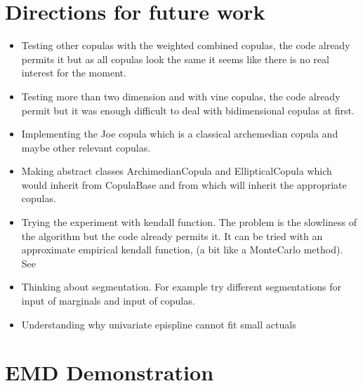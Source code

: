 \documentclass{article}
\begin{document}
	
	\newpage
	\section{Directions for future work}
	\label{sec:directions}
	\begin{itemize}
	
	\item
	Testing other copulas with the weighted combined copulas, the code already permits it but as all copulas look the same it seems like there is no real interest for the moment.

\item
Testing more than two dimension and with vine copulas, the code already permit but it was enough difficult to deal with bidimensional copulas at first.

\item
Implementing the Joe copula which is a classical archemedian copula and maybe other relevant copulas.

\item
Making abstract classes ArchimedianCopula and EllipticalCopula which would inherit from CopulaBase and from which will inherit the appropriate copulas.

\item
Trying the experiment with kendall function. The problem is the slowliness of the algorithm but the code already permits it. It can be tried with an approximate empirical kendall function, (a bit like a MonteCarlo method). See \cite{kendallfunction}

\item
Thinking about segmentation. For example try different segmentations for input of marginals and input of copulas.

\item
Understanding why univariate epispline cannot fit small actuals
	\end{itemize}

	\newpage
	\section{EMD Demonstration}
   
\end{document}
